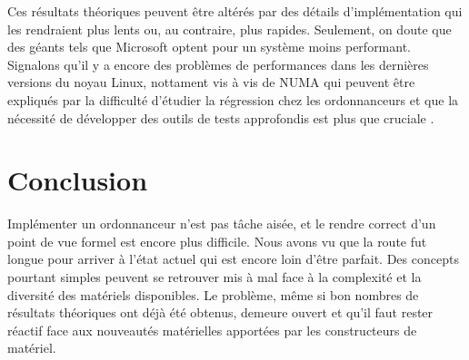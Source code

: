 \documentclass[letterpaper]{article}
\begin{document}
Ces résultats théoriques peuvent être altérés par des détails d'implémentation qui les rendraient plus lents ou, au contraire, plus rapides. Seulement, on doute que des géants tels que Microsoft optent pour un système moins performant. Signalons qu'il y a encore des problèmes de performances dans les dernières versions du noyau Linux, nottament vis à vis de NUMA \citep{lozi2016linux, blagodurov2010case} qui peuvent être expliqués par la difficulté d'étudier la régression chez les ordonnanceurs \citep{chen2007keeping} et que la nécessité de développer des outils de tests approfondis est plus que cruciale \citep{erickson2010effective}.

\section{Conclusion}

Implémenter un ordonnanceur n'est pas tâche aisée, et le rendre correct d'un point de vue formel est encore plus difficile. Nous avons vu que la route fut longue pour arriver à l'état actuel qui est encore loin d'être parfait. Des concepts pourtant simples peuvent se retrouver mis à mal face à la complexité et la diversité des matériels disponibles. Le problème, même si bon nombres de résultats théoriques ont déjà été obtenus, demeure ouvert et qu'il faut rester réactif face aux nouveautés matérielles apportées par les constructeurs de matériel.

\footnotesize


\end{document}
